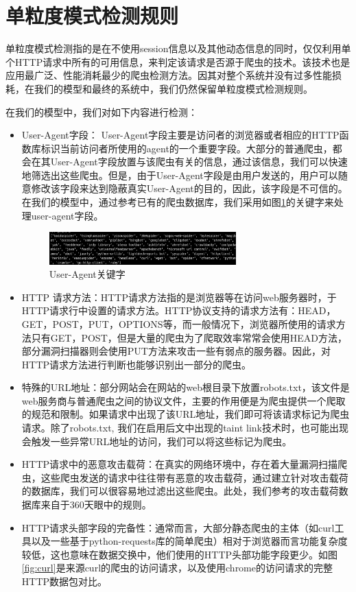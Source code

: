 \documentclass[doctor,privacy,twoside]{buaa_mac}
\begin{document}
\section{单粒度模式检测规则}
单粒度模式检测指的是在不使用session信息以及其他动态信息的同时，仅仅利用单个HTTP请求中所有的可用信息，来判定该请求是否源于爬虫的技术。该技术也是应用最广泛、性能消耗最少的爬虫检测方法。因其对整个系统并没有过多性能损耗，在我们的模型和最终的系统中，我们仍然保留单粒度模式检测规则。

在我们的模型中，我们对如下内容进行检测：

\begin{itemize}
\item[(1)] User-Agent字段： User-Agent字段主要是访问者的浏览器或者相应的HTTP函数库标识当前访问者所使用的agent的一个重要字段。大部分的普通爬虫，都会在其User-Agent字段放置与该爬虫有关的信息，通过该信息，我们可以快速地筛选出这些爬虫。但是，由于User-Agent字段是由用户发送的，用户可以随意修改该字段来达到隐蔽真实User-Agent的目的，因此，该字段是不可信的。在我们的模型中，通过参考已有的爬虫数据库，我们采用如图\ref{fig:ua}的关键字来处理user-agent字段。
    
\centerline{}
\begin{figure}[!h]
  \centering
  \includegraphics[width=0.68\textwidth]{images/crawler_key_words.png}
  \caption{User-Agent关键字}
  \label{fig:ua}
\end{figure}
\centerline{}
    
\item[(2)] HTTP 请求方法：HTTP请求方法指的是浏览器等在访问web服务器时，于HTTP请求行中设置的请求方法。HTTP协议支持的请求方法有：HEAD，GET，POST，PUT，OPTIONS等，而一般情况下，浏览器所使用的请求方法只有GET，POST，但是大量的爬虫为了爬取效率常常会使用HEAD方法，部分漏洞扫描器则会使用PUT方法来攻击一些有弱点的服务器。因此，对HTTP请求方法进行判断也能够识别出一部分的爬虫。

\item[(3)] 特殊的URL地址：部分网站会在网站的web根目录下放置robots.txt，该文件是web服务商与普通爬虫之间的协议文件，主要的作用便是为爬虫提供一个爬取的规范和限制。如果请求中出现了该URL地址，我们即可将该请求标记为爬虫请求。除了robots.txt, 我们在启用后文中出现的taint link技术时，也可能出现会触发一些异常URL地址的访问，我们可以将这些标记为爬虫。

\item[(4)] HTTP请求中的恶意攻击载荷：在真实的网络环境中，存在着大量漏洞扫描爬虫，这些爬虫发送的请求中往往带有恶意的攻击载荷，通过建立针对攻击载荷的数据库，我们可以很容易地过滤出这些爬虫。此处，我们参考的攻击载荷数据库来自于360天眼中的规则。

\item[(5)] HTTP请求头部字段的完备性：通常而言，大部分静态爬虫的主体（如curl工具以及一些基于python-requests库的简单爬虫）相对于浏览器而言功能复杂度较低，这也意味在数据交换中，他们使用的HTTP头部功能字段更少。如图\ref{fig:curl}是来源curl的爬虫的访问请求，以及使用chrome的访问请求的完整HTTP数据包对比。
\end{itemize}
\end{document}
